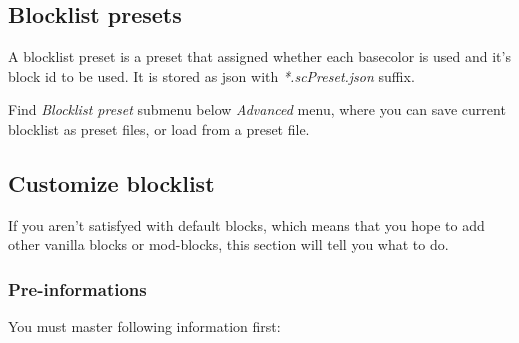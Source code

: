 \documentclass{article}
\begin{document}
   \subsection{Blocklist presets}
   A blocklist preset is a preset that assigned whether each basecolor is used and it's block id to be used. It is stored as json with \textit{*.scPreset.json} suffix.

   Find \textit{Blocklist preset} submenu below \textit{Advanced} menu, where you can save current blocklist as preset files, or load from a preset file.

   \subsection{Customize blocklist}
   If you aren't satisfyed with default blocks, which means that you hope to add other vanilla blocks or mod-blocks, this section will tell you what to do.
   
   \subsubsection{Pre-informations}
   You must master following information first:
\end{document}
